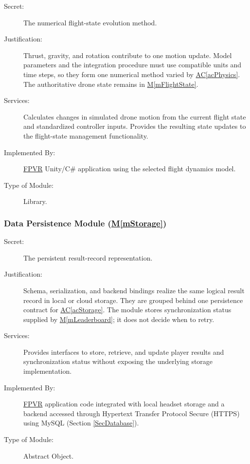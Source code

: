 \documentclass[12pt, titlepage]{article}
\DeclareRobustCommand{\mgabbr}[2]{\hyperlink{mg-abbr:#1}{#2}}
\newcommand{\acref}[1]{\mgabbr{ac}{AC}\ref{#1}}
\newcommand{\mref}[1]{\hyperref[#1]{M\ref*{#1}}}
\begin{document}
\begin{description}

\item[Secret:]
The numerical flight-state evolution method.

\item[Justification:]
Thrust, gravity, and rotation contribute to one motion update. Model
parameters and the integration procedure must use compatible units and
time steps, so they form one numerical method varied by \acref{acPhysics}.
The authoritative drone state remains in \mref{mFlightState}.

\item[Services:]
Calculates changes in simulated drone motion from
the current flight state and standardized controller
inputs. Provides the resulting state updates to the
flight-state management functionality.

\item[Implemented By:]
\mgabbr{fpvr}{FPVR} Unity/C\# application using the selected flight
dynamics model.

\item[Type of Module:]
Library.

\end{description}


\subsubsection{Data Persistence Module (\mref{mStorage})}

\begin{description}

\item[Secret:]
The persistent result-record representation.

\item[Justification:]
Schema, serialization, and backend bindings realize the same logical
result record in local or cloud storage. They are grouped behind one
persistence contract for \acref{acStorage}. The module stores synchronization
status supplied by \mref{mLeaderboard}; it does not decide when to retry.

\item[Services:]
Provides interfaces to store, retrieve, and update
player results and synchronization status without
exposing the underlying storage implementation.

\item[Implemented By:]
\mgabbr{fpvr}{FPVR} application code integrated with local headset storage
and a backend accessed through Hypertext Transfer Protocol Secure (HTTPS) using
MySQL (Section \ref{SecDatabase}).

\item[Type of Module:]
Abstract Object.

\end{description}
\end{document}
